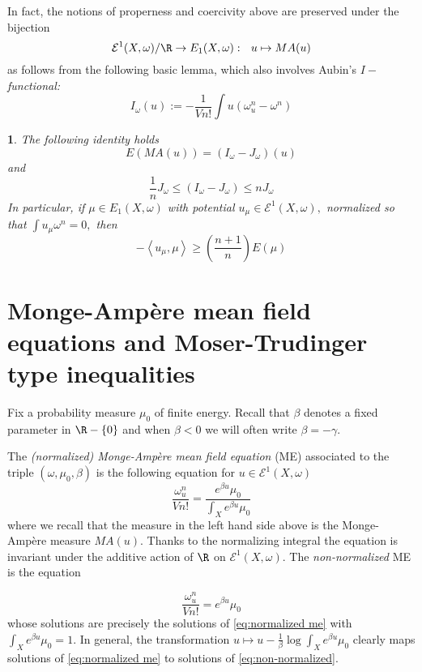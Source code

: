 \documentclass[11pt,oneside,english]{amsart}
\numberwithin{equation}{section}
\numberwithin{figure}{section}
\theoremstyle{plain}
\theoremstyle{plain}
\theoremstyle{plain}
\newtheorem{lem}[thm]{\protect\lemmaname}
\theoremstyle{plain}
\theoremstyle{remark}
\theoremstyle{definition}
\providecommand{\lemmaname}{Lemma}
\begin{document}
In fact, the notions of properness and coercivity above are preserved
under the bijection 
\[
\mathcal{E}^{1}(X,\omega)/\R\rightarrow E_{1}(X,\omega):\,\,\,\, u\mapsto MA(u)
\]
 as follows from the following basic lemma, which also involves Aubin's
\emph{$I-$functional:} 
\[
I_{\omega}(u):=-\frac{1}{Vn!}\int u(\omega_{u}^{n}-\omega^{n})
\]

\begin{lem}
\label{lem:energy as i minus j}The following identity holds 
\[
E(MA(u))=(I_{\omega}-J_{\omega})(u)
\]
 and 
\begin{equation}
\frac{1}{n}J_{\omega}\leq(I_{\omega}-J_{\omega})\leq nJ_{\omega}\label{eq:ineq for i and j}
\end{equation}
In particular, if $\mu\in E_{1}(X,\omega)$ with potential $u_{\mu}\in\mathcal{E}^{1}(X,\omega),$
normalized so that $\int u_{\mu}\omega^{n}=0,$ then 
\begin{equation}
-\left\langle u_{\mu},\mu\right\rangle \geq(\frac{n+1}{n})E(\mu)\label{eq:energy bounded by pairing}
\end{equation}

\end{lem}

\section{\label{sec:Monge-Amp=00003D0000E8re-mean-field}Monge-Ampère mean
field equations and Moser-Trudinger type inequalities }

Fix a probability measure $\mu_{0}$ of finite energy. Recall that
$\beta$ denotes a fixed parameter in $\R-\{0\}$ and when $\beta<0$
we will often write $\beta=-\gamma.$

The \emph{(normalized) Monge-Ampère mean field equation} (ME) associated
to the triple $(\omega,\mu_{0},\beta)$ is the following equation
for $u\in\mathcal{E}^{1}(X,\omega)$ 
\begin{equation}
\frac{\omega_{u}^{n}}{Vn!}=\frac{e^{\beta u}\mu_{0}}{\int_{X}e^{\beta u}\mu_{0}}\label{eq:normalized me}
\end{equation}
 where we recall that the measure in the left hand side above is the
Monge-Ampère measure $MA(u).$ Thanks to the normalizing integral
the equation is invariant under the additive action of $\R$ on $\mathcal{E}^{1}(X,\omega).$
The \emph{non-normalized }ME is the equation

\begin{equation}
\frac{\omega_{u}^{n}}{Vn!}=e^{\beta u}\mu_{0}\label{eq:non-normalized}
\end{equation}
 whose solutions are precisely the solutions of \ref{eq:normalized me}
with $\int_{X}e^{\beta u}\mu_{0}=1.$ In general, the transformation
$u\mapsto u-\frac{1}{\beta}\log\int_{X}e^{\beta u}\mu_{0}$ clearly
maps solutions of \ref{eq:normalized me} to solutions of \ref{eq:non-normalized}.
\end{document}

